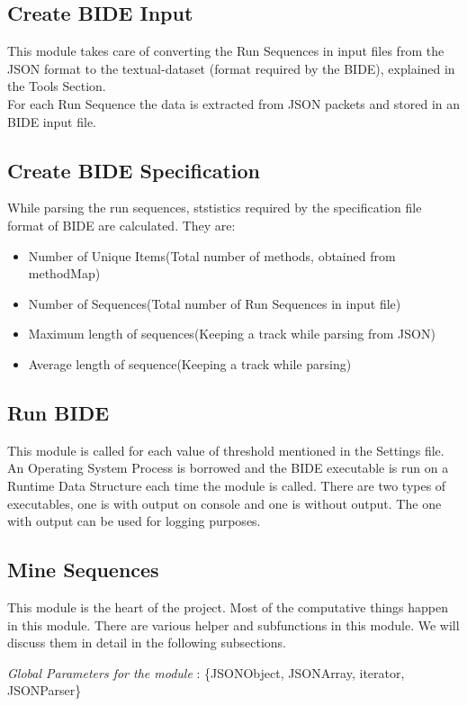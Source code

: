 \subsection{Create BIDE Input}
This module takes care of converting the Run Sequences in input files from the JSON format to the textual-dataset (format required by the BIDE), explained in the Tools Section.\\
For each Run Sequence the data is extracted from JSON packets and stored in an BIDE input file.

\subsection{Create BIDE Specification}
While parsing the run sequences, ststistics required by the specification file format of BIDE are calculated.
They are:
\begin{itemize}
\item Number of Unique Items(Total number of methods, obtained from methodMap)
\item Number of Sequences(Total number of Run Sequences in input file)
\item Maximum length of sequences(Keeping a track while parsing from JSON)
\item Average length of sequence(Keeping a track while parsing)
\end{itemize}

\subsection{Run BIDE}
This module is called for each value of threshold mentioned in the Settings file.\\
An Operating System Process is borrowed and the BIDE executable is run on a Runtime Data Structure each time the module is called. There are two types of executables, one is with output on console and one is without output. The one with output can be used for logging purposes.

\subsection{Mine Sequences}
This module is the heart of the project. Most of the computative things happen in this module. There are various helper and subfunctions in this module. We will discuss them in detail in the following subsections.

\emph{Global Parameters for the module} : \{JSONObject, JSONArray, iterator, JSONParser\}

